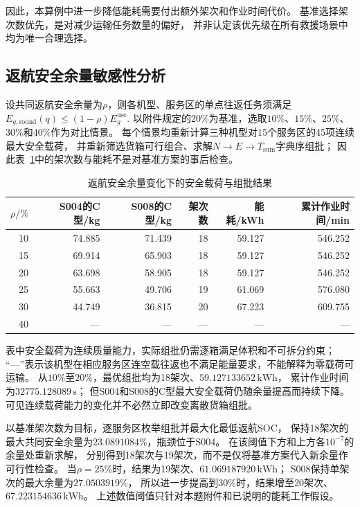 \documentclass[bwprint]{gmcmthesis}
\begin{document}
因此，本算例中进一步降低能耗需要付出额外架次和作业时间代价。
基准选择架次数优先，是对减少运输任务数量的偏好，
并非认定该优先级在所有救援场景中均为唯一合理选择。

\subsection{返航安全余量敏感性分析}

设共同返航安全余量为$\rho$，则各机型、服务区的单点往返任务须满足
\(E_{g,\mathrm{round}}(q)\leq (1-\rho)E_g^{\mathrm{use}}\).
以附件规定的$20\%$为基准，选取$10\%$、$15\%$、$25\%$、$30\%$和$40\%$作为对比情景。
每个情景均重新计算三种机型对15个服务区的45项连续最大安全载荷，
并重新筛选货箱可行组合、求解$N\rightarrow E\rightarrow T_{\mathrm{sum}}$字典序组批；
因此表~\ref{tab:q1_reserve_sensitivity}中的架次数与能耗不是对基准方案的事后检查。

\begin{table}[htbp]
    \centering
    \caption{返航安全余量变化下的安全载荷与组批结果}
    \label{tab:q1_reserve_sensitivity}
    \begin{tabular}{rrrrrr}
        \toprule
        $\rho/\%$ & S004的C型/kg & S008的C型/kg & 架次数 & 能耗/kWh & 累计作业时间/min \\
        \midrule
10 & 74.885 & 71.439 & 18 & 59.127 & 546.252 \\
15 & 69.914 & 65.903 & 18 & 59.127 & 546.252 \\
20 & 63.698 & 58.905 & 18 & 59.127 & 546.252 \\
25 & 55.663 & 49.706 & 19 & 61.069 & 576.080 \\
30 & 44.749 & 36.815 & 20 & 67.223 & 609.755 \\
40 & --- & --- & --- & --- & --- \\
        \bottomrule
    \end{tabular}
\end{table}
\FloatBarrier

表中安全载荷为连续质量能力，实际组批仍需逐箱满足体积和不可拆分约束；
“---”表示该机型在相应服务区连空载往返也不满足能量要求，不能解释为零载荷可运输。
从$10\%$至$20\%$，最优组批均为18架次、$59.127133652\,\mathrm{kWh}$，
累计作业时间为$32775.128089\,\mathrm{s}$；
但S004和S008的C型最大安全载荷仍随余量提高而持续下降。
可见连续载荷能力的变化并不必然立即改变离散货箱组批。

以基准架次数为目标，逐服务区枚举组批并最大化最低返航SOC，
保持18架次的最大共同安全余量为$23.0891084\%$，瓶颈位于S004。
在该阈值下方和上方各$10^{-7}$的余量处重新求解，
分别得到18架次与19架次，而不是仅将基准方案代入新余量作可行性检查。
当$\rho=25\%$时，结果为19架次、$61.069187920\,\mathrm{kWh}$；
S008保持单架次的最大余量为$27.0503919\%$，
所以进一步提高到$30\%$时，结果增至20架次、$67.223154636\,\mathrm{kWh}$。
上述数值阈值只针对本题附件和已说明的能耗工作假设。
\end{document}
